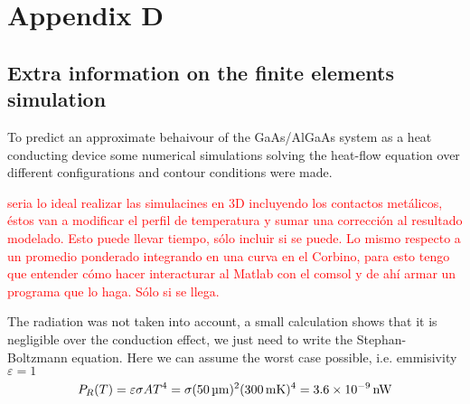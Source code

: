 \chapter{Appendix D}
\label{appendixd}

\section{Extra information on the finite elements simulation} 

To predict an approximate behaivour of the GaAs/AlGaAs system as a heat conducting device some numerical simulations solving the heat-flow equation over different configurations and contour conditions were made.

\textcolor{red}{seria lo ideal realizar las simulacines en 3D incluyendo los contactos metálicos, éstos van a modificar el perfil de temperatura y sumar una corrección al resultado modelado. Esto puede llevar tiempo, sólo incluir si se puede. Lo mismo respecto a un promedio ponderado integrando en una curva en el Corbino, para esto tengo que entender cómo hacer interacturar al Matlab con el comsol y de ahí armar un programa que lo haga. Sólo si se llega.}

The radiation was not taken into account, a small calculation shows that it is negligible over the conduction effect, we just need to write the Stephan-Boltzmann equation. Here we can assume the worst case possible, i.e. emmisivity $ \varepsilon = 1$
\begin{equation}
    P_R(T) = \varepsilon \sigma A T^4 = \sigma (\SI{50}{\micro\meter})^2 (\SI{300}{\milli\kelvin})^4 = \SI{3.6E-9}{\nano\watt}
\end{equation}



